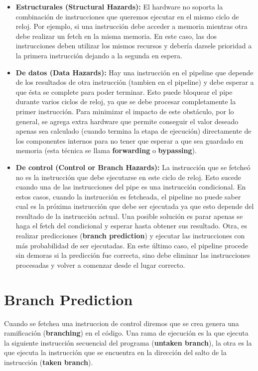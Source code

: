 \begin{itemize}
	\item \textbf{Estructurales (Structural Hazards):} El hardware no soporta la combinación de instrucciones que queremos ejecutar en el mismo ciclo de reloj. Por ejemplo, si una instrucción debe acceder a memoria mientras otra debe realizar un fetch en la misma memoria. En este caso, las dos instrucciones deben utilizar los mismos recursos y debería darsele prioridad a la primera instrucción dejando a la segunda en espera.
	\item \textbf{De datos (Data Hazards):} Hay una instrucción en el pipeline que depende de los resultados de otra instrucción (tambien en el pipeline) y debe esperar a que ésta se complete para poder terminar. Esto puede bloquear el pipe durante varios ciclos de reloj, ya que se debe procesar completamente la primer instrucción. Para minimizar el impacto de este obstáculo, por lo general, se agrega extra hardware que permite conseguir el valor deseado apenas sea calculado (cuando termina la etapa de ejecución) directamente de los componentes internos para no tener que esperar a que sea guardado en memoria (esta técnica se llama \textbf{forwarding} o \textbf{bypassing}).
	\item \textbf{De control (Control or Branch Hazards):} La instrucción que se fetcheó no es la instrucción que debe ejecutarse en este ciclo de reloj. Esto sucede cuando una de las instrucciones del pipe es una instrucción condicional. En estos casos, cuando la instrucción es fetcheada, el pipeline no puede saber cual es la próxima instrucción que debe ser ejecutada ya que esto depende del resultado de la instrucción actual. Una posible solución es parar apenas se haga el fetch del condicional y esperar hasta obtener sus resultado. Otra, es realizar predicciones (\textbf{branch prediction}) y ejecutar las instrucciones con más probabilidad de ser ejecutadas. En este último caso, el pipeline procede sin demoras si la predicción fue correcta, sino debe eliminar las instrucciones procesadas y volver a comenzar desde el lugar correcto.
\end{itemize}

\newpage
\section{Branch Prediction}\label{sec::branchPrediction}
Cuando se fetchea una instruccion de control diremos que se crea genera una ramificación (\textbf{branching}) en el código. Una rama de ejecución es la que ejecuta la siguiente instrucción secuencial del programa (\textbf{untaken branch}), la otra es la que ejecuta la instrucción que se encuentra en la dirección del salto de la instrucción (\textbf{taken branch}).

